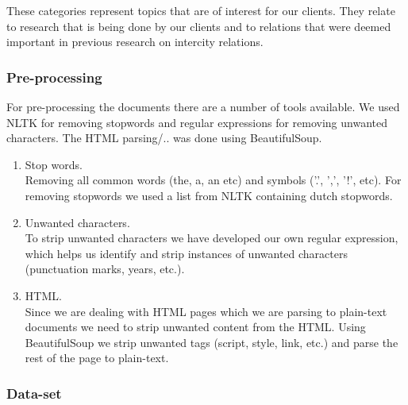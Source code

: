 These categories represent topics that are of interest for our clients. They relate to research that is being done by our clients and to relations that were deemed important in previous research on intercity relations.

\subsubsection{Pre-processing}

For pre-processing the documents there are a number of tools available. We used NLTK \cite{nlkt_stemming} for removing stopwords and regular expressions for removing unwanted characters. The HTML parsing/.. was done using BeautifulSoup.

\begin{enumerate}
\item Stop words. \\ 
Removing all common words (the, a, an etc) and symbols ('.', ',', '!', etc). For removing stopwords we used a list from NLTK containing dutch stopwords.

\item Unwanted characters. \\
To strip unwanted characters we have developed our own regular expression, which helps us identify and strip instances of unwanted characters (punctuation marks, years, etc.). 

\item HTML. \\
Since we are dealing with HTML pages which we are parsing to plain-text documents we need to strip unwanted content from the HTML. Using BeautifulSoup we strip unwanted tags (script, style, link, etc.) and parse the rest of the page to plain-text.
\end{enumerate}

\subsubsection{Data-set}

